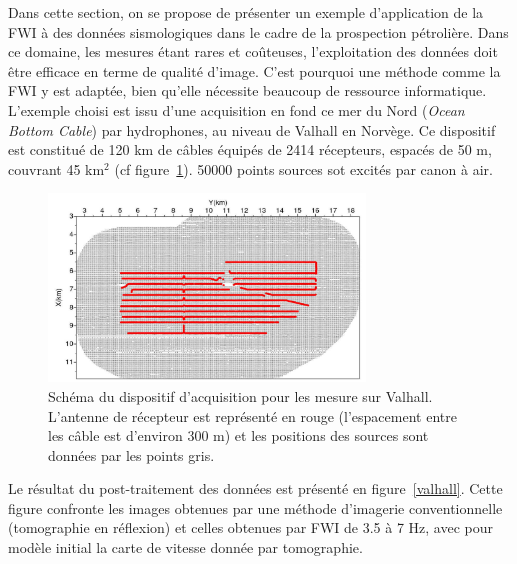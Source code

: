 Dans cette section, on se propose de présenter un exemple d'application de la FWI à des données sismologiques dans le cadre de la prospection pétrolière. Dans ce domaine, les mesures étant rares et coûteuses, l'exploitation des données doit être efficace en terme de qualité d'image. C'est pourquoi une méthode comme la FWI y est adaptée, bien qu'elle nécessite beaucoup de ressource informatique.\\

L'exemple choisi est issu d'une acquisition en fond ce mer du Nord (\emph{Ocean Bottom Cable}) par hydrophones, au niveau de Valhall en Norvège. Ce dispositif est constitué de 120 km de câbles équipés de 2414 récepteurs, espacés de 50 m, couvrant 45 km$^{2}$ (cf figure~\ref{dispositif_valhall}). 50000 points sources sot excités par canon à air.

\begin{figure}[!h]
	\centering
	\includegraphics[height=5cm]{img/dispo_valhall.jpg}
	\caption{Schéma du dispositif d'acquisition pour les mesure sur Valhall. L'antenne de récepteur est représenté en rouge (l'espacement entre les câble est d'environ 300 m) et les positions des sources sont données par les points gris.\label{dispositif_valhall}}
\end{figure}

Le résultat du post-traitement des données  est présenté en figure~\ref{valhall}. Cette figure confronte les images obtenues par une méthode d'imagerie conventionnelle (tomographie en réflexion) et celles obtenues par FWI de 3.5 à 7 Hz, avec pour modèle initial la carte de vitesse donnée par tomographie.

